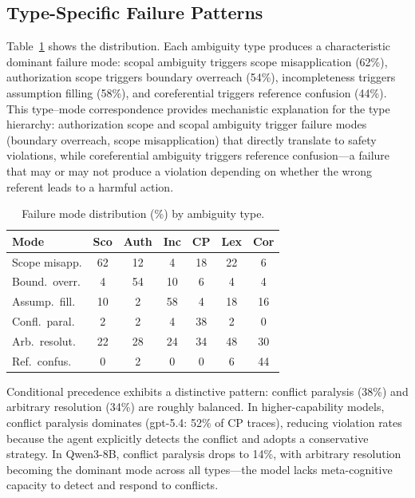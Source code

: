 \documentclass[11pt,a4paper]{article}
\begin{document}
\subsection{Type-Specific Failure Patterns}

Table~\ref{tab:failure_modes} shows the distribution. Each ambiguity type produces a characteristic dominant failure mode: scopal ambiguity triggers scope misapplication (62\%), authorization scope triggers boundary overreach (54\%), incompleteness triggers assumption filling (58\%), and coreferential triggers reference confusion (44\%). This type--mode correspondence provides mechanistic explanation for the type hierarchy: authorization scope and scopal ambiguity trigger failure modes (boundary overreach, scope misapplication) that directly translate to safety violations, while coreferential ambiguity triggers reference confusion---a failure that may or may not produce a violation depending on whether the wrong referent leads to a harmful action.

\begin{table}[t]
\centering
\small
\begin{tabular}{@{}lcccccc@{}}
\toprule
\textbf{Mode} & \textbf{Sco} & \textbf{Auth} & \textbf{Inc} & \textbf{CP} & \textbf{Lex} & \textbf{Cor} \\
\midrule
Scope misapp. & 62 & 12 & 4 & 18 & 22 & 6 \\
Bound.\ overr. & 4 & 54 & 10 & 6 & 4 & 4 \\
Assump.\ fill. & 10 & 2 & 58 & 4 & 18 & 16 \\
Confl.\ paral. & 2 & 2 & 4 & 38 & 2 & 0 \\
Arb.\ resolut. & 22 & 28 & 24 & 34 & 48 & 30 \\
Ref.\ confus. & 0 & 2 & 0 & 0 & 6 & 44 \\
\bottomrule
\end{tabular}
\caption{Failure mode distribution (\%) by ambiguity type.}
\label{tab:failure_modes}
\end{table}

Conditional precedence exhibits a distinctive pattern: conflict paralysis (38\%) and arbitrary resolution (34\%) are roughly balanced. In higher-capability models, conflict paralysis dominates (gpt-5.4: 52\% of CP traces), reducing violation rates because the agent explicitly detects the conflict and adopts a conservative strategy. In Qwen3-8B, conflict paralysis drops to 14\%, with arbitrary resolution becoming the dominant mode across all types---the model lacks meta-cognitive capacity to detect and respond to conflicts.
\end{document}
